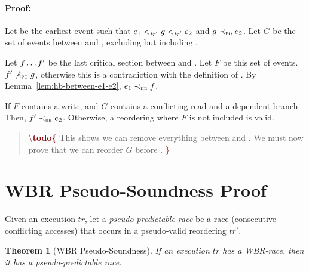\documentclass[letter,10pt]{article}
\newtheorem{thm}{Theorem}
\newcommand{\tr}{\ensuremath{\mathit{tr}}\xspace}
\newcommand{\trPrime}{\ensuremath{\mathit{tr'}}\xspace}
\newcommand{\PO}{PO\xspace}
\newcommand{\HB}{HB\xspace}
\newcommand{\BR}{BR\xspace}
\newcommand{\WBR}{W\BR}
\newcommand{\ltTRPrime}{\ensuremath{<_\textsc{\trPrime}}\xspace}
\newcommand{\ltPO}{\ensuremath{\prec_\textsc{\tiny{\PO}}}\xspace}
\newcommand{\nltPO}{\ensuremath{\not\prec_\textsc{\tiny{\PO}}}\xspace}
\newcommand{\ltHB}{\ensuremath{\prec_\textsc{\tiny{\HB}}}\xspace}
\newcommand{\ltBR}{\ensuremath{\prec_\textsc{\tiny{\BR}}}\xspace}
\newcommand{\Ordered}[3]{\ensuremath{#1 #2 #3}}
\newcommand{\OrderedThree}[4]{\Ordered{#2}{#1}{\Ordered{#3}{#1}{#4}}}
\newcommand{\POOrdered}[2]{\Ordered{#1}{\ltPO}{#2}}
\newcommand{\nPOOrdered}[2]{\Ordered{#1}{\nltPO}{#2}}
\newcommand{\HBOrdered}[2]{\Ordered{#1}{\ltHB}{#2}}
\newcommand{\BROrdered}[2]{\Ordered{#1}{\ltBR}{#2}}
\newcommand\todo[1]{\begin{quote}\textcolor{darkred}{\textbackslash \textbf{todo\{}} #1 \textcolor{darkred}{\}}\end{quote}}
\begin{document}
\paragraph{Proof:} Let  be the earliest event such that
\OrderedThree{\ltTRPrime}{\event{e}{_1}}{\event{g}}{\event{e}{_2}} and \POOrdered{\event{g}}{\event{e}{_2}}. Let $G$ be
the set of events between  and , excluding 
but including .

Let $\event{f}\ldots\event{f}{'}$ be the last critical section between
 and . Let $F$ be this set of events.
\nPOOrdered{\event{f}{'}}{\event{g}}, otherwise this is a contradiction with the
definition of . By Lemma~\ref{lem:hb-between-e1-e2},
\HBOrdered{\event{e}{_1}}{\event{f}}.

If $F$ contains a write, and $G$ contains a conflicting read and a dependent
branch. Then, \BROrdered{\event{f}{'}}{\event{e}{_2}}. Otherwise, a reordering
where $F$ is not included is valid.

\todo{This shows we can remove everything between  and \event{g}.
  We must now prove that we can reorder $G$ before \event{e}{_1}.}

\section{\WBR Pseudo-Soundness Proof}

Given an execution \tr, let a \emph{pseudo-predictable race} be a race (consecutive conflicting accesses) that occurs in a
pseudo-valid reordering \trPrime.

\begin{thm}[\WBR Pseudo-Soundness]
  If an execution \tr has a \WBR-race,
  then it has a pseudo-predictable race.
  \label{thm:wbr-pseudo-sound}
\end{thm}
\end{document}
